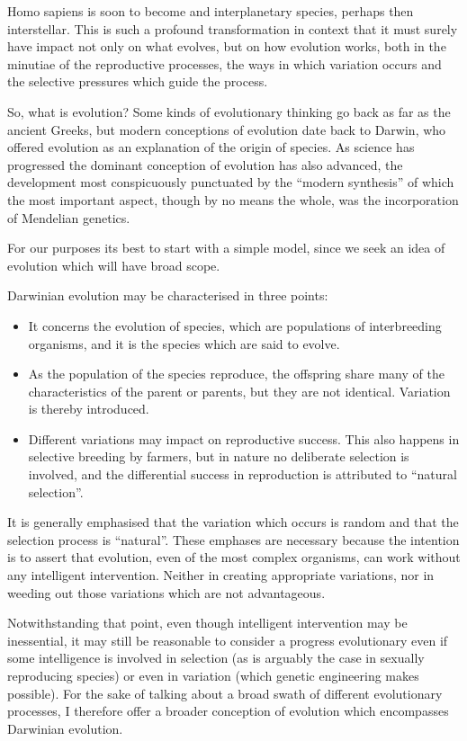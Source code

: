 \documentclass[10pt,titlepage]{article}
\begin{document}
Homo sapiens is soon to become and interplanetary species, perhaps then interstellar.
This is such a profound transformation in context that it must surely have impact not only on what evolves, but on how evolution works, both in the minutiae of the reproductive processes, the ways in which variation occurs and the selective pressures which guide the process.

So, what is evolution?
Some kinds of evolutionary thinking go back as far as the ancient Greeks, but modern conceptions of evolution date back to Darwin, who offered evolution as an explanation of the origin of species.
As science has progressed the dominant conception of evolution has also advanced, the development most conspicuously punctuated by the ``modern synthesis'' of which the most important aspect, though by no means the whole, was the incorporation of Mendelian genetics.

For our purposes its best to start with a simple model, since we seek an idea of evolution which will have broad scope.

Darwinian evolution may be characterised in three points:

\begin{itemize}
\item It concerns the evolution of species, which are populations of interbreeding organisms, and it is the species which are said to evolve.
\item As the population of the species reproduce, the offspring share many of the characteristics of the parent or parents, but they are not identical.
  Variation is thereby introduced.
\item Different variations may impact on reproductive success.
  This also happens in selective breeding by farmers, but in nature no deliberate selection is involved, and the differential success in reproduction is attributed to ``natural selection''.
\end{itemize}

It is generally emphasised that the variation which occurs is random and that the selection process is ``natural''.
These emphases are necessary because the intention is to assert that evolution, even of the most complex organisms, can work without any intelligent intervention.
Neither in creating appropriate variations, nor in weeding out those variations which are not advantageous.

Notwithstanding that point, even though intelligent intervention may be inessential, it may still be reasonable to consider a progress evolutionary even if some intelligence is involved in selection (as is arguably the case in sexually reproducing species) or even in variation (which genetic engineering makes possible).
For the sake of talking about a broad swath of different evolutionary processes, I therefore offer a broader conception of evolution which encompasses Darwinian evolution.
\end{document}
